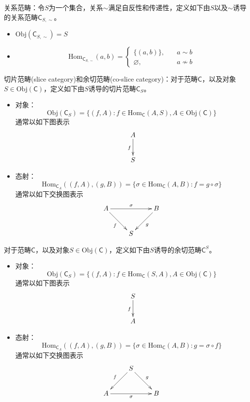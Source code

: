 \begin{example}
	关系范畴：令$S$为一个集合，关系$\sim$满足自反性和传递性，定义如下由$S$以及$\sim$诱导的关系范畴$\mathsf{C}_{S,\sim}$。
	\begin{itemize}
		\item $\mathrm{Obj}(\mathsf{C}_{S,\sim})=S$
		\item $$
		\mathrm{Hom}_{\mathsf{C}_{S,\sim}}(a,b)=\begin{cases}
			\{(a,b)\},\quad & a\sim b\\
			\varnothing,\quad & a\not\sim b
		\end{cases}
		$$
	\end{itemize}
\end{example}

\begin{example}
	切片范畴(slice category)和余切范畴(co-slice category)：对于范畴$\mathsf{C}$，以及对象$S\in\mathrm{Obj}(\mathsf{C})$，定义如下由$S$诱导的切片范畴$\mathsf{C}_S$。
	\begin{itemize}
		\item 对象：
		$$
		\mathrm{Obj}(\mathsf{C}_S)=\{ (f,A):f\in\mathrm{Hom}_\mathsf{C}(A,S),A\in\mathrm{Obj}(\mathsf{C}) \}
		$$
		通常以如下图表示
		$$
		\xymatrix{
			A\ar_f[d]\\
			S
		}
		$$
		\item 态射：
		$$
		\mathrm{Hom}_{\mathsf{C}_A}((f,A),(g,B))=\{ \sigma\in\mathrm{Hom}_\mathsf{C}(A,B):f=g\circ\sigma \}
		$$
		通常以如下交换图表示
		$$
		\xymatrix{
			A \ar[rr]^\sigma \ar[dr]_{f} & & B \ar[dl]^{g}\\
			&S
		}
		$$
	\end{itemize}
	对于范畴$\mathsf{C}$，以及对象$S\in\mathrm{Obj}(\mathsf{C})$，定义如下由$S$诱导的余切范畴$\mathsf{C}^S$。
	\begin{itemize}
		\item 对象：
		$$
		\mathrm{Obj}(\mathsf{C}_S)=\{ (f,A):f\in\mathrm{Hom}_\mathsf{C}(S,A),A\in\mathrm{Obj}(\mathsf{C}) \}
		$$
		通常以如下图表示
		$$
		\xymatrix{
			S\ar_f[d]\\
			A
		}
		$$
		\item 态射：
		$$
		\mathrm{Hom}_{\mathsf{C}_A}((f,A),(g,B))=\{ \sigma\in\mathrm{Hom}_\mathsf{C}(A,B):g=\sigma\circ f \}
		$$
		通常以如下交换图表示
		$$
		\xymatrix{
			&S\ar[dl]_{f} \ar[dr]^{g}&\\
			A \ar[rr]_\sigma  & & B 
		}
		$$
	\end{itemize}
\end{example}

